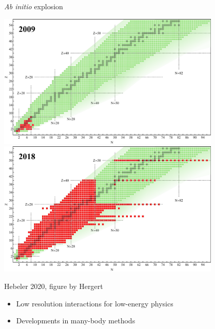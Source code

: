 \documentclass{beamer}
\begin{document}
  \begin{frame}{\textit{Ab initio} explosion}
    \begin{center}
      \begin{overprint}
        \centering\includegraphics[width=0.8\textwidth]{proposal/talk/images/external/nuclear_chart_2009.pdf}
        \centering\includegraphics[width=0.8\textwidth]{proposal/talk/images/external/nuclear_chart_2018.pdf}
      \end{overprint}
      {\tiny Hebeler 2020, figure by Hergert}
    \end{center}
    \begin{itemize}
      \item{Low resolution interactions for low-energy physics}
      \item{Developments in many-body methods}
    \end{itemize}
  \end{frame}
\end{document}
